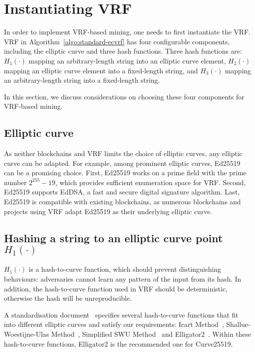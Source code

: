 \section{Instantiating VRF}
\label{sec:instantiation}

In order to implement VRF-based mining, one needs to first instantiate the VRF.
VRF in Algorithm~\ref{algo:standard-ecvrf} has four configurable components, including the elliptic curve and three hash functions.
Three hash functions are:
$H_{1}(\cdot)$ mapping an arbitrary-length string into an elliptic curve element,
$H_{2}(\cdot)$ mapping an elliptic curve element into a fixed-length string, and
$H_{3}(\cdot)$ mapping an arbitrary-length string into a fixed-length string.

In this section, we discuss considerations on choosing these four components for VRF-based mining.





\subsection{Elliptic curve}

As neither blockchains and VRF limits the choice of elliptic curves, any elliptic curve can be adapted.
For example, among prominent elliptic curves, Ed25519~\cite{bernstein2012high} can be a promising choice.
First, Ed25519 works on a prime field with the prime number $2^{255} - 19$, which provides sufficient enumeration space for VRF.
Second, Ed25519 supports EdDSA, a fast and secure digital signature algorithm.
Last, Ed25519 is compatible with existing blockchains, as numerous blockchains and projects using VRF adapt Ed25519 as their underlying elliptic curve.




\subsection{Hashing a string to an elliptic curve point $H_{1}(\cdot)$}

$H_{1}(\cdot)$ is a hash-to-curve function, which should prevent distinguishing behaviours: adversaries cannot learn any pattern of the input from its hash.
In addition, the hash-to-curve function used in VRF should be deterministic, otherwise the hash will be unreproducible.

A standardisation document~\cite{scott2019hashing} specifies several hash-to-curve functions that fit into different elliptic curves and satisfy our requirements: Icart Method~\cite{icart2009hash}, Shallue-Woestijne-Ulas Method~\cite{ulas2007rational}, Simplified SWU Method~\cite{brier2010efficient} and Elligator2~\cite{bernstein2013elligator}.
Within these hash-to-curve functions, Elligator2 is the recommended one for Curve25519.





